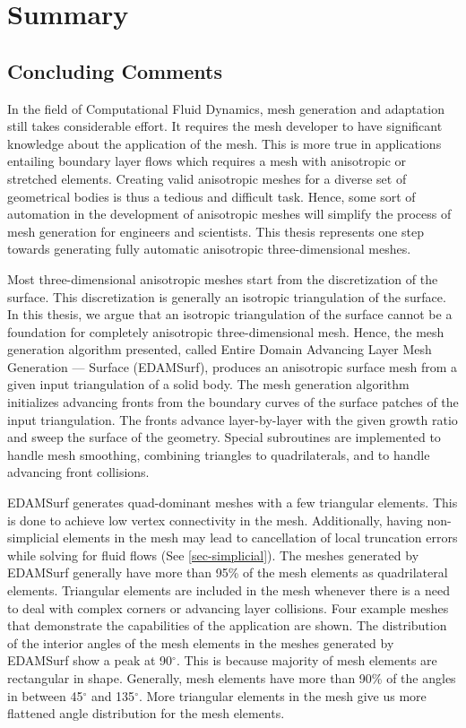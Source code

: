 \chapter{Summary}

\section{Concluding Comments}

In the field of Computational Fluid Dynamics, mesh generation and adaptation still takes considerable effort. It requires the mesh developer to have significant knowledge about the application of the mesh. This is more true in applications entailing boundary layer flows which requires a mesh with anisotropic or stretched elements. Creating valid anisotropic meshes for a diverse set of geometrical bodies is thus a tedious and difficult task. Hence, some sort of automation in the development of anisotropic meshes will simplify the process of mesh generation for engineers and scientists. This thesis represents one step towards generating fully automatic anisotropic three-dimensional meshes.

Most three-dimensional anisotropic meshes start from the discretization of the surface. This discretization is generally an isotropic triangulation of the surface. In this thesis, we argue that an isotropic triangulation of the surface cannot be a foundation for completely anisotropic three-dimensional mesh. Hence, the mesh generation algorithm presented, called Entire Domain Advancing Layer Mesh Generation --- Surface (EDAMSurf), produces an anisotropic surface mesh from a given input triangulation of a solid body. The mesh generation algorithm initializes advancing fronts from the boundary curves of the surface patches of the input triangulation. The fronts advance layer-by-layer with the given growth ratio and sweep the surface of the geometry. Special subroutines are implemented to handle mesh smoothing, combining triangles to quadrilaterals, and to handle advancing front collisions.

EDAMSurf generates quad-dominant meshes with a few triangular elements. This is done to achieve low vertex connectivity in the mesh. Additionally, having non-simplicial elements in the mesh may lead to cancellation of local truncation errors while solving for fluid flows (See \ref{sec-simplicial}). The meshes generated by EDAMSurf generally have more than 95\% of the mesh elements as quadrilateral elements. Triangular elements are included in the mesh whenever there is a need to deal with complex corners or advancing layer collisions. Four example meshes that demonstrate the capabilities of the application are shown. The distribution of the interior angles of the mesh elements in the meshes generated by EDAMSurf show a peak at 90$^\circ$. This is because majority of mesh elements are rectangular in shape. Generally, mesh elements have more than 90\% of the angles in between 45$^\circ$ and 135$^\circ$. More triangular elements in the mesh give us more flattened angle distribution for the mesh elements.

